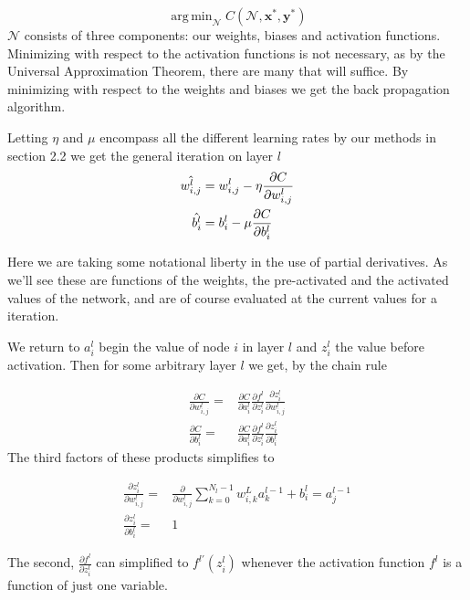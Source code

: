 \documentclass{article}
\theoremstyle{definition}
\DeclareMathOperator*{\argmin}{arg\,min}
\begin{document}
\[
\argmin_{\mathcal{N}} C(\mathcal{N}, \boldsymbol{x}^*, \mathbf{y}^*) 
\]
$\mathcal{N}$ consists of three components: our weights, biases and activation functions. Minimizing with respect to the activation functions is not necessary, as by the Universal Approximation Theorem, there are many that will suffice. By minimizing with respect to the weights and biases we get the back propagation algorithm.

Letting $\eta$ and $\mu$ encompass all the different learning rates by our methods in section 2.2 we get the general iteration on layer $l$
\begin{align*}
    \hat{w_{i,j}^{l}} =\hspace{1mm}&
    w_{i,j}^{l} - \eta \frac{\partial C}{\partial {w_{i,j}^{l}}}\\
    \hat{b_i^{l}} =\hspace{1mm}& b_i^{l} - \mu  \frac{\partial C}{\partial b_i^l} 
\end{align*}

Here we are taking some notational liberty in the use of partial derivatives. As we'll see these are functions of the weights, the pre-activated and the activated values of the network, and are of course evaluated at the current values for a iteration. 

 We return to $a_i^l$ begin the value of node $i$ in layer $l$ and $z_i^l$ the value before activation. Then for some arbitrary layer $l$ we get, by the chain rule

\begin{align}
    \frac{\partial C}{\partial w_{i,j}^l} =& \frac{\partial C}{\partial a_i^l} \frac{\partial f^l}{\partial z_i^l} \frac{\partial z_i^l}{\partial w_{i,j}^l} \label{eq:1} 
    \\
    \frac{\partial C}{\partial b_i^l} = & \frac{\partial C}{\partial a_i^l} \frac{\partial f^l}{\partial z_i^l} \frac{\partial z_i^l}{\partial b_i^l} \label{eq:2} 
\end{align}
The third factors of these products simplifies to

\begin{align}
    \frac{\partial z_{i}^l }{\partial w_{i,j}^l} = &  \frac{\partial}{\partial w_{i,j}^l} \sum_{k = 0}^{N_l - 1} w_{i,k}^L a_k^{l-1} + b_i^l = a_j^{l-1} \label{eq:3} \\
    \frac{\partial z_i^l}{\partial b_i^l} = &  1 \label{eq:4} 
\end{align}

\noindent
The second, $\frac{\partial f^l}{\partial z_i^l}$ can simplified to $f^{l'}(z_i^l)$ whenever the activation function $f^l$ is a function of just one variable. 
\end{document}
